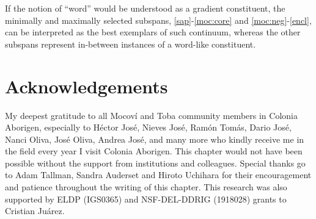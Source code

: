 \documentclass[output=paper]{langscibook}
\begin{document}
If the notion of ``word'' would be understood as a gradient constituent, the minimally and maximally  selected subspans, \ref{sap}-\ref{moc:core} and \ref{moc:neg}-\ref{encl},  can be interpreted as the best exemplars of such continuum, whereas the other subspans represent in-between instances of  a word-like constituent.


\section*{Acknowledgements}
My deepest gratitude to all Mocoví and Toba community members in Colonia Aborigen, especially to Héctor José, Nieves José, Ramón Tomás, Dario José, Nanci Oliva, José Oliva, Andrea José, and many more who kindly receive me in the field every year I visit Colonia Aborigen. This chapter would not have been possible without the support from institutions and colleagues. Special thanks go to Adam Tallman, Sandra Auderset and Hiroto Uchihara for their encouragement and patience throughout the writing of this chapter. This research was also supported by ELDP (IGS0365) and NSF-DEL-DDRIG (1918028) grants to Cristian Juárez.

\largerpage[-2]
\printglossary

\printbibliography[heading=subbibliography,notkeyword=this]
\end{document}
